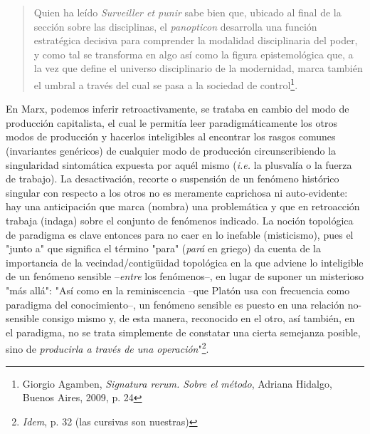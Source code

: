 \begin{quote}
Quien ha leído \emph{Surveiller et punir} sabe bien que, ubicado al
final de la sección sobre las disciplinas, el \emph{panopticon}
desarrolla una función estratégica decisiva para comprender la modalidad
disciplinaria del poder, y como tal se transforma en algo así como la
figura epistemológica que, a la vez que define el universo disciplinario
de la modernidad, marca también el umbral a través del cual se pasa a la
sociedad de control\footnote{Giorgio Agamben, \emph{Signatura rerum.
  Sobre el método}, Adriana Hidalgo, Buenos Aires, 2009, p. 24}.
\end{quote}

En Marx, podemos inferir retroactivamente, se trataba en cambio del modo
de producción capitalista, el cual le permitía leer paradigmáticamente
los otros modos de producción y hacerlos inteligibles al encontrar los
rasgos comunes (invariantes genéricos) de cualquier modo de producción
circunscribiendo la singularidad sintomática expuesta por aquél mismo
(\emph{i.e.} la plusvalía o la fuerza de trabajo). La desactivación,
recorte o suspensión de un fenómeno histórico singular con respecto a
los otros no es meramente caprichosa ni auto-evidente: hay una
anticipación que marca (nombra) una problemática y que en retroacción
trabaja (indaga) sobre el conjunto de fenómenos indicado. La noción
topológica de paradigma es clave entonces para no caer en lo inefable
(misticismo), pues el "junto a" que significa el término "para"
(\emph{pará} en griego) da cuenta de la importancia de la
vecindad/contigüidad topológica en la que adviene lo inteligible de un
fenómeno sensible --\emph{entre} los fenómenos--, en lugar de suponer un
misterioso "más allá": "Así como en la reminiscencia --que Platón usa
con frecuencia como paradigma del conocimiento--, un fenómeno sensible
es puesto en una relación no-sensible consigo mismo y, de esta manera,
reconocido en el otro, así también, en el paradigma, no se trata
simplemente de constatar una cierta semejanza posible, sino de
\emph{producirla a través de una operación}"\footnote{\emph{Idem}, p. 32
  (las cursivas son nuestras)}.

